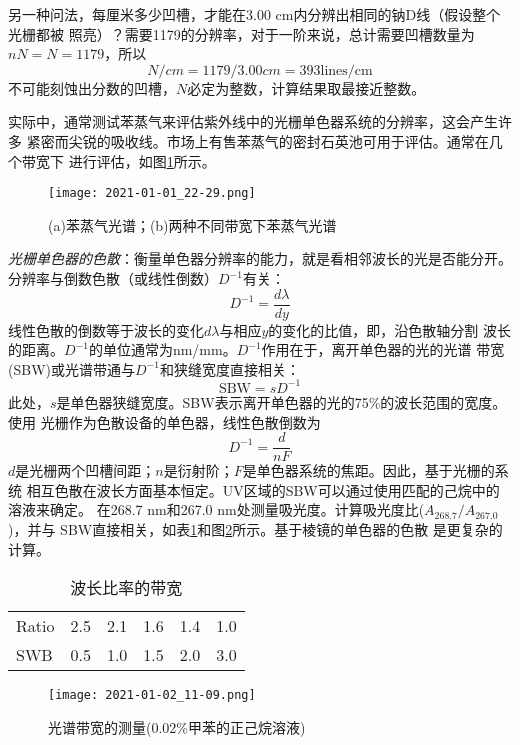 另一种问法，每厘米多少凹槽，才能在3.00 cm内分辨出相同的钠D线（假设整个光栅都被
照亮）？需要1179的分辨率，对于一阶来说，总计需要凹槽数量为$nN=N=1179$，所以
\[
    N/cm = 1179/3.00 cm = 393 \text{lines/cm}
\]
不可能刻蚀出分数的凹槽，$N$必定为整数，计算结果取最接近整数。

实际中，通常测试苯蒸气来评估紫外线中的光栅单色器系统的分辨率，这会产生许多
紧密而尖锐的吸收线。市场上有售苯蒸气的密封石英池可用于评估。通常在几个带宽下
进行评估，如图\ref{fig:2.25}所示。
\begin{figure}[htpb]
    \centering
    \texttt{[image: 2021-01-01\_22-29.png]}
    \caption{(a)苯蒸气光谱；(b)两种不同带宽下苯蒸气光谱}
    \label{fig:2.25}
\end{figure}

\emph{光栅单色器的色散}：衡量单色器分辨率的能力，就是看相邻波长的光是否能分开。
分辨率与倒数色散（或线性倒数）$D^{-1}$有关：
\begin{equation}
    D^{-1}=\frac{d\lambda}{dy}
    \label{2.21}
\end{equation}
线性色散的倒数等于波长的变化$d\lambda$与相应$y$的变化的比值，即，沿色散轴分割
波长的距离。$D^{-1}$的单位通常为nm/mm。$D^{-1}$作用在于，离开单色器的光的光谱
带宽(SBW)或光谱带通与$D^{-1}$和狭缝宽度直接相关：
\[
    \text{SBW}=sD^{-1}
\]
此处，$s$是单色器狭缝宽度。SBW表示离开单色器的光的75\%的波长范围的宽度。使用
光栅作为色散设备的单色器，线性色散倒数为
\begin{equation}
    D^{-1}=\frac{d}{nF}
    \label{2.23}
\end{equation}
$d$是光栅两个凹槽间距；$n$是衍射阶；$F$是单色器系统的焦距。因此，基于光栅的系统
相互色散在波长方面基本恒定。UV区域的SBW可以通过使用匹配的己烷中的溶液来确定。
在268.7 nm和267.0 nm处测量吸光度。计算吸光度比($A_{268.7}/A_{267.0}$)，并与
SBW直接相关，如表\ref{tab:2.11}和图\ref{fig:2.26}所示。基于棱镜的单色器的色散
是更复杂的计算。
\begin{table}[htbp]
    \centering
    \caption{波长比率的带宽}
    \label{tab:2.11}
    \begin{tabular}{lccccr}
        \hline
        Ratio & 2.5 & 2.1 & 1.6 & 1.4 & 1.0 \\
        SWB   & 0.5 & 1.0 & 1.5 & 2.0 & 3.0 \\
        \hline
    \end{tabular}
\end{table}
\begin{figure}[htpb]
    \centering
    \texttt{[image: 2021-01-02\_11-09.png]}
    \caption{光谱带宽的测量(0.02\%甲苯的正己烷溶液)}
    \label{fig:2.26}
\end{figure}

